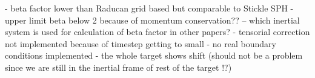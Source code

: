 - beta factor lower than Raducan grid based but comparable to Stickle SPH
- upper limit beta below 2 because of momentum conservation?? -- which inertial system is used for calculation of beta factor in other papers?
- tensorial correction not implemented because of timestep getting to small
- no real boundary conditions implemented
- the whole target shows shift (should not be a problem since we are still in the inertial frame of rest of the target !?)

